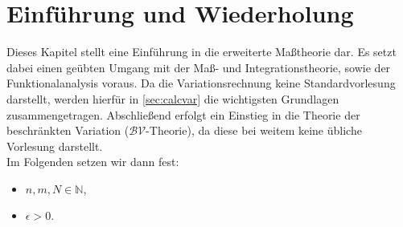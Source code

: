 \chapter{Einführung und Wiederholung}{\label{ch:intro}}
Dieses Kapitel stellt eine Einführung in die erweiterte Maßtheorie dar. Es setzt dabei einen geübten Umgang mit der Maß- und Integrationstheorie, sowie der Funktionalanalysis voraus. Da die Variationsrechnung keine Standardvorlesung darstellt, werden hierfür in \ref{sec:calcvar} die wichtigsten Grundlagen zusammengetragen. Abschließend erfolgt ein Einstieg in die Theorie der beschränkten Variation (\(\mathcal{BV}\)-Theorie), da diese bei weitem keine übliche Vorlesung darstellt.\\
Im Folgenden setzen wir dann fest:
\begin{itemize}
    \item \(n,m,N \in \mathbb{N}\),
    \item \(\epsilon > 0\).
\end{itemize}
